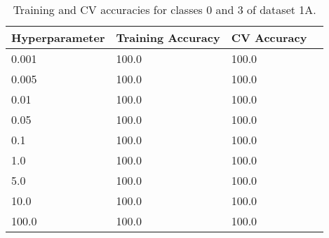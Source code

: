 \def\arraystretch{1.25}
\begin{table}[H]
{\small
\centering
\begin{tabular}{l l l c}
\hline
\hline
\textbf{Hyperparameter} & \textbf{Training Accuracy}  &  \textbf{CV Accuracy}\\
\hline
\hline
0.001 & 100.0 & 100.0\\
0.005 & 100.0 & 100.0\\
0.01 & 100.0 & 100.0\\
0.05 & 100.0 & 100.0\\
0.1 & 100.0 & 100.0\\
1.0 & 100.0 & 100.0\\
5.0 & 100.0 & 100.0\\
10.0 & 100.0 & 100.0\\
100.0 & 100.0 & 100.0\\
\hline
\end{tabular}
\caption{Training and CV accuracies for classes 0 and 3 of dataset 1A.}
}
\end{table}